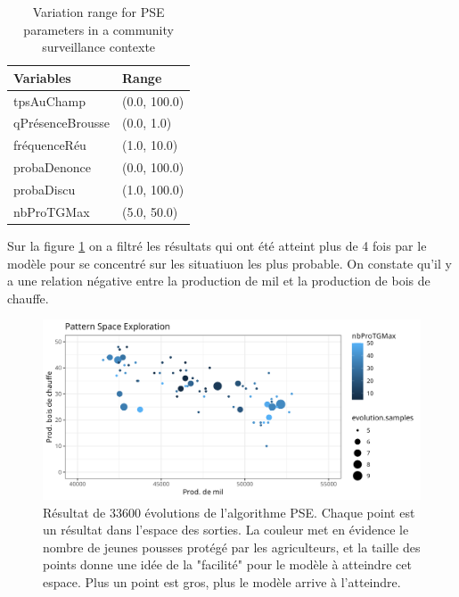\documentclass{article}
\begin{document}
    \begin{table}
        \centering\begingroup\fontsize{10}{12}\selectfont
            \begin{tabular}[]{ll}
                    \toprule
                    Variables & Range\\
                    \hline
                    \addlinespace
                    tpsAuChamp & (0.0, 100.0)\\
                    qPrésenceBrousse & (0.0, 1.0)\\
                    fréquenceRéu & (1.0, 10.0)\\
                    probaDenonce & (0.0, 100.0)\\
                    probaDiscu & (1.0, 100.0)\\
                    nbProTGMax & (5.0, 50.0)\\
                    \bottomrule
            \end{tabular}
            \caption{Variation range for PSE parameters in a community surveillance contexte}
            \label{tab:PSEparamsPop}
        \endgroup{}
    \end{table}

    Sur la figure \ref{fig:PSE} on a filtré les résultats qui ont été atteint plus de 4 fois par le modèle pour se concentré sur les situatiuon les plus probable. On constate qu'il y a une relation négative entre la production de mil et la production de bois de chauffe. 

        \begin{figure}[h]
            \centering
            \includegraphics[width=\textwidth]{./img/om_pse.png}
            \caption{Résultat de 33600 évolutions de l'algorithme PSE. Chaque point est un résultat dans l'espace des sorties. La couleur met en évidence le nombre de jeunes pousses protégé par les agriculteurs, et la taille des points donne une idée de la "facilité" pour le modèle à atteindre cet espace. Plus un point est gros, plus le modèle arrive à l'atteindre.}
            \label{fig:PSE}
        \end{figure}
\end{document}
